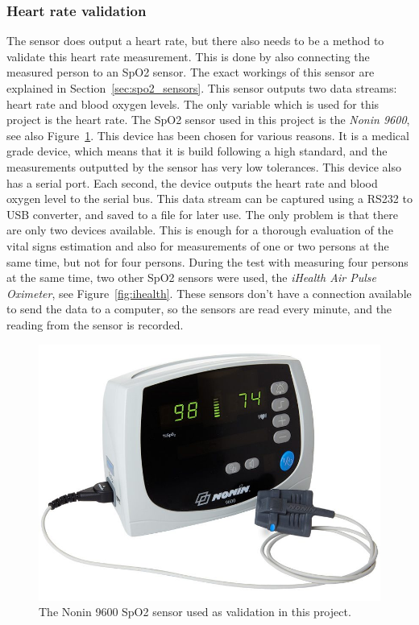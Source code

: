 \subsubsection{Heart rate validation}
\label{sec:heartrate_validation}
The sensor does output a heart rate, but there also needs to be a method to validate this heart rate measurement. This is done by also connecting the measured person to an SpO2 sensor. The exact workings of this sensor are explained in Section~\ref{sec:spo2_sensors}. This sensor outputs two data streams: heart rate and blood oxygen levels. The only variable which is used for this project is the heart rate. The SpO2 sensor used in this project is the \emph{Nonin 9600}, see also Figure~\ref{fig:nonin_9600}. This device has been chosen for various reasons. It is a medical grade device, which means that it is build following a high standard, and the measurements outputted by the sensor has very low tolerances. This device also has a serial port. Each second, the device outputs the heart rate and blood oxygen level to the serial bus. This data stream can be captured using a RS232 to USB converter, and saved to a file for later use. The only problem is that there are only two devices available. This is enough for a thorough evaluation of the vital signs estimation and also for measurements of one or two persons at the same time, but not for four persons. During the test with measuring four persons at the same time, two other SpO2 sensors were used, the \emph{iHealth Air Pulse Oximeter}, see Figure~\ref{fig:ihealth}. These sensors don't have a connection available to send the data to a computer, so the sensors are read every minute, and the reading from the sensor is recorded. 

\begin{figure}[t]
    \centering
    \includegraphics[width=.6\textwidth]{figures/validation/nonin_9600.jpg}
    \caption{The Nonin 9600 SpO2 sensor used as validation in this project.}
    \label{fig:nonin_9600}
\end{figure}

